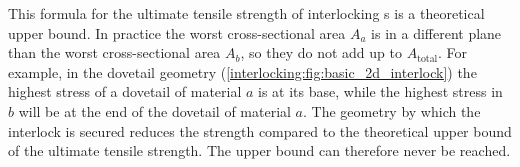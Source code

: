 This formula for the ultimate tensile strength of interlocking s is a theoretical upper bound.
In practice the worst cross-sectional area $A_a$ is in a different plane than the worst cross-sectional area $A_b$, so they do not add up to $A_\text{total}$.
For example, in the dovetail geometry (\cref{interlocking:fig:basic_2d_interlock}) the highest stress of a dovetail of material $a$ is at its base, while the highest stress in $b$ will be at the end of the dovetail of material $a$.
The geometry by which the interlock is secured reduces the strength compared to the theoretical upper bound of the ultimate tensile strength.
The upper bound can therefore never be reached.







